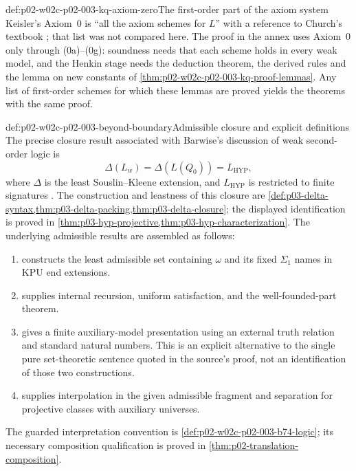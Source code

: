 \begin{hbwarning}{def:p02-w02c-p02-003-kq-axiom-zero}{The first-order part of the axiom system}
Keisler's Axiom~0 is ``all the axiom schemes for \(L\)'' with a reference
to Church's textbook \cite[\S1, p.~6]{Keisler1970}; that list was not
compared here.  The proof in the annex uses Axiom~0 only through
(0a)--(0g): soundness needs that each scheme holds in every weak model, and
the Henkin stage needs the deduction theorem, the derived rules and the
lemma on new constants of \cref{thm:p02-w02c-p02-003-kq-proof-lemmas}.  Any
list of first-order schemes for which these lemmas are proved yields the
theorems with the same proof.
\end{hbwarning}

\begin{hbconvention}{def:p02-w02c-p02-003-beyond-boundary}{Admissible closure and explicit definitions}
The precise closure result associated with Barwise's discussion of weak
second-order logic is
\[
 \Delta(L_w)=\Delta(L(Q_0))=L_{\mathrm{HYP}},
\]
where \(\Delta\) is the least Souslin--Kleene extension, and
\(L_{\mathrm{HYP}}\) is restricted to finite signatures
\cite[Part~II, \S4, Theorem~4.1, pp.~260--262]{Barwise1974Axioms}.
The construction and leastness of this closure are
\cref{def:p03-delta-syntax,thm:p03-delta-packing,thm:p03-delta-closure};
the displayed identification is proved in
\cref{thm:p03-hyp-projective,thm:p03-hyp-characterization}.
The underlying admissible results are assembled as follows:
\begin{enumerate}
\item {} constructs the
      least admissible set containing \(\omega\) and its fixed
      \(\Sigma_1\) names in KPU end extensions.
\item {}
      supplies internal recursion, uniform satisfaction, and the
      well-founded-part theorem.
\item {} gives a finite
      auxiliary-model presentation using an external truth relation and
      standard natural numbers. This is an explicit alternative to the
      single pure set-theoretic sentence quoted in the source's proof,
      not an identification of those two constructions.
\item {}
      supplies interpolation in the given admissible fragment and
      separation for projective classes with auxiliary universes.
\end{enumerate}
The guarded interpretation convention is
\cref{def:p02-w02c-p02-003-b74-logic}; its necessary composition
qualification is proved in \cref{thm:p02-translation-composition}.


\end{hbconvention}
